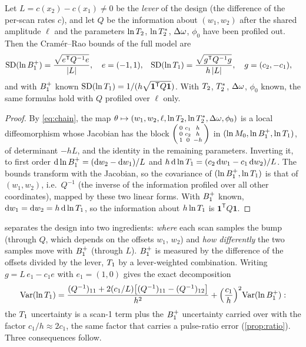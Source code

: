 \begin{proposition}\label{prop:closed}
Let $L=c(x_2)-c(x_1)\ne0$ be the \emph{lever} of the design (the difference of the per-scan rates
$c$), and let $Q$ be the information about $(w_1,w_2)$ after the
shared amplitude $\ell$ and the parameters $\ln T_2$, $\ln T_2^{*}$, $\Delta\omega$, $\phi_0$ have been profiled out. Then the
Cram\'er--Rao bounds of the full model are
\begin{align}
  \mathrm{SD}(\ln B_1^{+})&=\frac{\sqrt{e^{\mathsf T}Q^{-1}e}}{|L|},\quad e=(-1,1),&
  \mathrm{SD}(\ln T_1)&=\frac{\sqrt{g^{\mathsf T}Q^{-1}g}}{h\,|L|},\quad g=(c_2,-c_1),
  \label{eq:closed}
\end{align}
and with $B_1^{+}$ known $\mathrm{SD}(\ln T_1)=1/(h\sqrt{\mathbf 1^{\mathsf T}Q\mathbf 1})$. With $T_2$, $T_2^{*}$, $\Delta\omega$, $\phi_0$ known, the
same formulas hold with $Q$ profiled over $\ell$ only.
\end{proposition}
\begin{proof}
By \eqref{eq:chain}, the map $\theta\mapsto(w_1,w_2,\ell,\ln T_2,\ln T_2^{*},\Delta\omega,\phi_0)$ is a local diffeomorphism whose
Jacobian has the block $\begin{psmallmatrix}0&c_1&h\\0&c_2&h\\1&0&-h\end{psmallmatrix}$ in $(\ln M_0,\ln B_1^{+},\ln T_1)$, of
determinant $-hL$, and the identity in the remaining parameters. Inverting it, to first order
$\mathrm d\ln B_1^{+}=(\mathrm dw_2-\mathrm dw_1)/L$ and $h\,\mathrm d\ln T_1=(c_2\,\mathrm dw_1-c_1\,\mathrm dw_2)/L$. The bounds transform with the
Jacobian, so the covariance of $(\ln B_1^{+},\ln T_1)$ is that of $(w_1,w_2)$, i.e.\ $Q^{-1}$ (the inverse of
the information profiled over all other coordinates), mapped by these two linear forms. With
$B_1^{+}$ known, $\mathrm dw_1=\mathrm dw_2=h\,\mathrm d\ln T_1$, so the information about $h\ln T_1$ is $\mathbf1^{\mathsf T}Q\mathbf1$.
\end{proof}

 separates the design into two ingredients: \emph{where} each scan samples the
bump (through $Q$, which depends on the offsets $w_1$, $w_2$) and \emph{how differently} the two samples
move with $B_1^{+}$ (through $L$). $B_1^{+}$ is measured by the difference of the offsets divided by the lever,
$T_1$ by a lever-weighted combination. Writing $g=L\,e_1-c_1e$ with $e_1=(1,0)$ gives the exact decomposition
\begin{equation}
  \mathrm{Var}(\ln T_1)=\frac{(Q^{-1})_{11}+2(c_1/L)\bigl[(Q^{-1})_{11}-(Q^{-1})_{12}\bigr]}{h^2}
  +\Bigl(\frac{c_1}{h}\Bigr)^2\mathrm{Var}(\ln B_1^{+}):
  \label{eq:t1decomp}
\end{equation}
the $T_1$ uncertainty is a scan-1 term plus the $B_1^{+}$ uncertainty carried over with the factor
$c_1/h\approx2c_1$, the same factor that carries a pulse-ratio error (\cref{prop:ratio}). Three
consequences follow.

